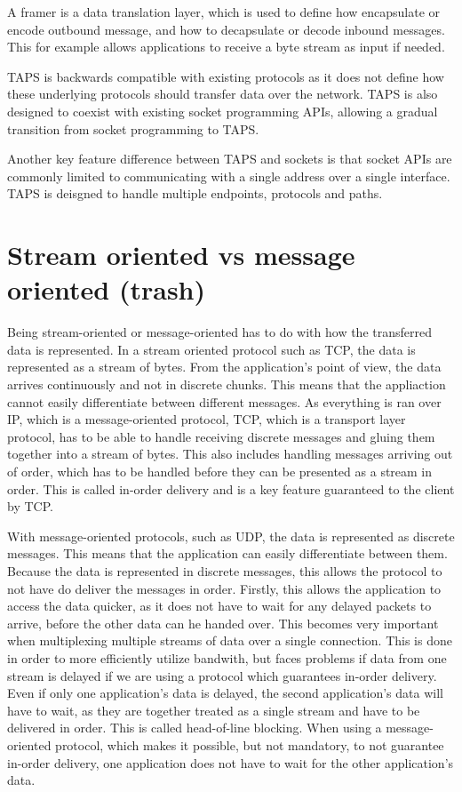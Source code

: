 A framer is a data translation layer, which is used to define
how encapsulate or encode outbound message, and how to decapsulate
or decode inbound messages. This for example allows applications
to receive a byte stream as input if needed.

TAPS is backwards compatible with existing protocols as it does not
define how these underlying protocols should transfer data over
the network. TAPS is also designed to coexist with existing
socket programming APIs, allowing a gradual transition from
socket programming to TAPS.

Another key feature difference between TAPS and sockets is that socket
APIs are commonly limited to communicating with a single address over 
a single interface. TAPS is deisgned to handle multiple endpoints,
protocols and paths.

\section{Stream oriented vs message oriented (trash)}
Being stream-oriented or message-oriented has to do with how the
transferred data is represented. In a stream oriented protocol
such as TCP, the data is represented as a stream of bytes. From
the application's point of view, the data arrives continuously
and not in discrete chunks. This means that the appliaction
cannot easily differentiate between different messages. As
everything is ran over IP, which is a message-oriented protocol,
TCP, which is a transport layer protocol, has to be able to
handle receiving discrete messages and gluing them together into
a stream of bytes. This also includes handling messages arriving
out of order, which has to be handled before they can be
presented as a stream in order. This is called in-order delivery
and is a key feature guaranteed to the client by TCP.

With message-oriented protocols, such as UDP, the data is
represented as discrete messages. This means that the
application can easily differentiate between them. Because the
data is represented in discrete messages, this allows the
protocol to not have do deliver the messages in order. Firstly,
this allows the application to access the data quicker, as it
does not have to wait for any delayed packets to arrive, before
the other data can he handed over. This becomes very important
when multiplexing multiple streams of data over a single
connection. This is done in order to more efficiently utilize
bandwith, but faces problems if data from one stream is delayed
if we are using a protocol which guarantees in-order delivery.
Even if only one application's data is delayed, the second
application's data will have to wait, as they are together
treated as a single stream and have to be delivered in order.
This is called head-of-line blocking. When using a
message-oriented protocol, which makes it possible, but not
mandatory, to not guarantee in-order delivery, one application
does not have to wait for the other application's data.


